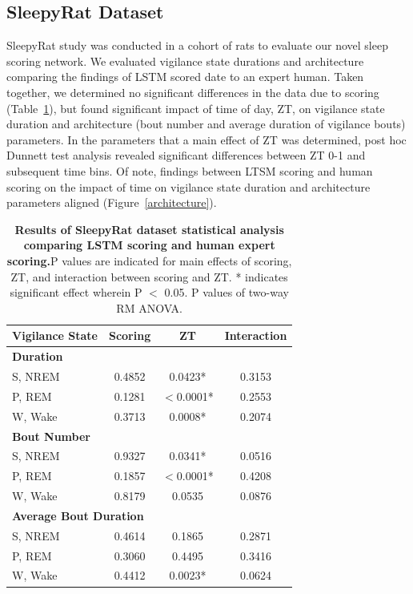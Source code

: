 \documentclass[pdflatex,sn-mathphys-num]{sn-jnl}%
\theoremstyle{thmstyleone}%
\theoremstyle{thmstyletwo}%
\theoremstyle{thmstylethree}%
\begin{document}
\subsection*{SleepyRat Dataset}
SleepyRat study was conducted in a cohort of rats to evaluate our novel sleep scoring network. We evaluated vigilance state durations and architecture comparing the findings of LSTM scored date to an expert human. Taken together, we determined no significant differences in the data due to scoring (Table~\ref{architecture_table}), but found significant impact of time of day, ZT, on vigilance state duration and architecture (bout number and average duration of vigilance bouts) parameters. In the parameters that a main effect of ZT was determined, post hoc Dunnett test analysis revealed significant differences between ZT 0-1 and subsequent time bins. Of note, findings between LTSM scoring and human scoring on the impact of time on vigilance state duration and architecture parameters aligned (Figure~\ref*{architecture}).

\begin{table}[ht]\label{architecture_table}
    \centering
    \caption{\textbf{Results of SleepyRat dataset statistical analysis comparing LSTM scoring and human expert scoring.}\quad P values are indicated for main effects of scoring, ZT, and interaction between scoring and ZT. * indicates significant effect wherein P $<$ 0.05. P values of two-way RM ANOVA.}
    \begin{tabular}{lccc}
    \toprule
    \textbf{Vigilance State} & \textbf{Scoring} & \textbf{ZT} & \textbf{Interaction} \\
    \midrule
    \multicolumn{4}{l}{\textbf{Duration}} \\
    S, NREM & 0.4852 & 0.0423* & 0.3153 \\
    P, REM & 0.1281 & $<$0.0001* & 0.2553 \\
    W, Wake & 0.3713 & 0.0008* & 0.2074 \\
    \midrule
    \multicolumn{4}{l}{\textbf{Bout Number}} \\
    S, NREM & 0.9327 & 0.0341* & 0.0516 \\
    P, REM & 0.1857 & $<$0.0001* & 0.4208 \\
    W, Wake & 0.8179 & 0.0535 & 0.0876 \\
    \midrule
    \multicolumn{4}{l}{\textbf{Average Bout Duration}} \\
    S, NREM & 0.4614 & 0.1865 & 0.2871 \\
    P, REM & 0.3060 & 0.4495 & 0.3416 \\
    W, Wake & 0.4412 & 0.0023* & 0.0624 \\
    \bottomrule
    \end{tabular}
    \end{table}
\end{document}
